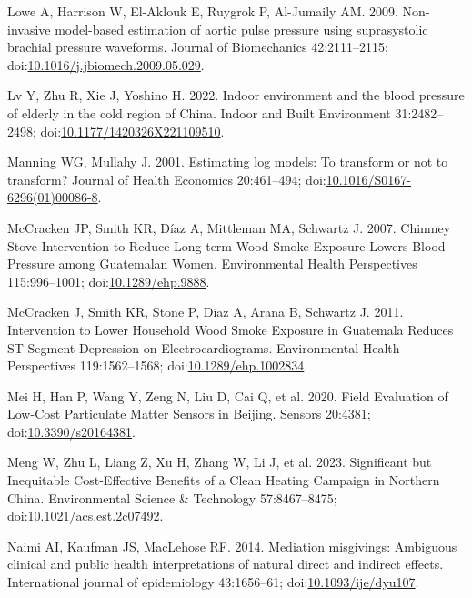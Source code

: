\documentclass[
  letterpaper,
  DIV=11,
  numbers=noendperiod]{scrartcl}
\newlength{\cslhangindent}
\newenvironment{CSLReferences}[2] %
 {\begin{list}{}{%
  \setlength{\itemindent}{0pt}
  \setlength{\leftmargin}{0pt}
  \setlength{\parsep}{0pt}
  \ifodd #1
   \setlength{\leftmargin}{\cslhangindent}
   \setlength{\itemindent}{-1\cslhangindent}
  \fi
  \setlength{\itemsep}{#2\baselineskip}}}
 {\end{list}}
\begin{document}
\begin{CSLReferences}{1}{1}
Lowe A, Harrison W, El-Aklouk E, Ruygrok P, Al-Jumaily AM. 2009.
Non-invasive model-based estimation of aortic pulse pressure using
suprasystolic brachial pressure waveforms. Journal of Biomechanics
42:2111--2115;
doi:\href{https://doi.org/10.1016/j.jbiomech.2009.05.029}{10.1016/j.jbiomech.2009.05.029}.

Lv Y, Zhu R, Xie J, Yoshino H. 2022. Indoor environment and the blood
pressure of elderly in the cold region of {China}. Indoor and Built
Environment 31:2482--2498;
doi:\href{https://doi.org/10.1177/1420326X221109510}{10.1177/1420326X221109510}.

Manning WG, Mullahy J. 2001. Estimating log models: To transform or not
to transform? Journal of Health Economics 20:461--494;
doi:\href{https://doi.org/10.1016/S0167-6296(01)00086-8}{10.1016/S0167-6296(01)00086-8}.

McCracken JP, Smith KR, Díaz A, Mittleman MA, Schwartz J. 2007. Chimney
{Stove Intervention} to {Reduce Long-term Wood Smoke Exposure Lowers
Blood Pressure} among {Guatemalan Women}. Environmental Health
Perspectives 115:996--1001;
doi:\href{https://doi.org/10.1289/ehp.9888}{10.1289/ehp.9888}.

McCracken J, Smith KR, Stone P, Díaz A, Arana B, Schwartz J. 2011.
Intervention to {Lower Household Wood Smoke Exposure} in {Guatemala
Reduces ST-Segment Depression} on {Electrocardiograms}. Environmental
Health Perspectives 119:1562--1568;
doi:\href{https://doi.org/10.1289/ehp.1002834}{10.1289/ehp.1002834}.

Mei H, Han P, Wang Y, Zeng N, Liu D, Cai Q, et al. 2020. Field
{Evaluation} of {Low-Cost Particulate Matter Sensors} in {Beijing}.
Sensors 20:4381;
doi:\href{https://doi.org/10.3390/s20164381}{10.3390/s20164381}.

Meng W, Zhu L, Liang Z, Xu H, Zhang W, Li J, et al. 2023. Significant
but {Inequitable Cost-Effective Benefits} of a {Clean Heating Campaign}
in {Northern China}. Environmental Science \& Technology 57:8467--8475;
doi:\href{https://doi.org/10.1021/acs.est.2c07492}{10.1021/acs.est.2c07492}.

Naimi AI, Kaufman JS, MacLehose RF. 2014. Mediation misgivings:
Ambiguous clinical and public health interpretations of natural direct
and indirect effects. International journal of epidemiology 43:1656--61;
doi:\href{https://doi.org/10.1093/ije/dyu107}{10.1093/ije/dyu107}.


\end{CSLReferences}
\end{document}
